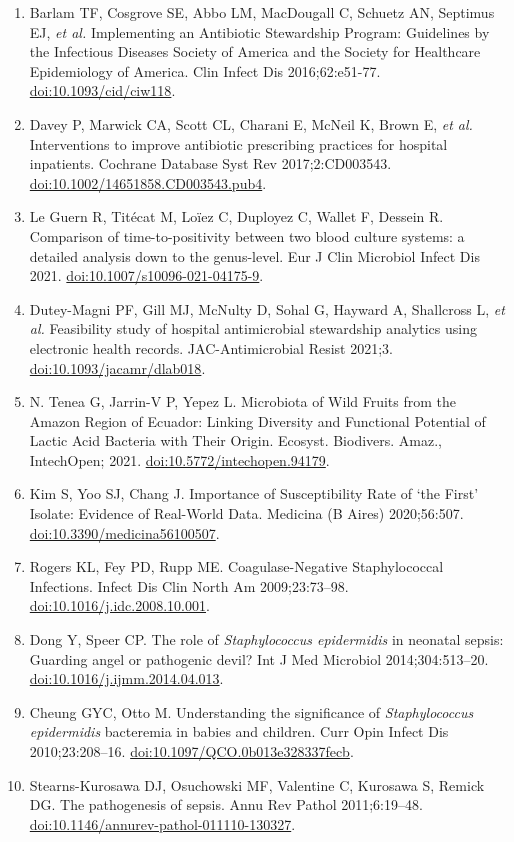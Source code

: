 \documentclass[
]{book}
\begin{document}
\begin{enumerate}
\item
  Barlam TF, Cosgrove SE, Abbo LM, MacDougall C, Schuetz AN, Septimus EJ, \emph{et al.} Implementing an Antibiotic Stewardship Program: Guidelines by the Infectious Diseases Society of America and the Society for Healthcare Epidemiology of America. Clin Infect Dis 2016;62:e51-77. \url{doi:10.1093/cid/ciw118}.
\item
  Davey P, Marwick CA, Scott CL, Charani E, McNeil K, Brown E, \emph{et al.} Interventions to improve antibiotic prescribing practices for hospital inpatients. Cochrane Database Syst Rev 2017;2:CD003543. \url{doi:10.1002/14651858.CD003543.pub4}.
\item
  Le Guern R, Titécat M, Loïez C, Duployez C, Wallet F, Dessein R. Comparison of time-to-positivity between two blood culture systems: a detailed analysis down to the genus-level. Eur J Clin Microbiol Infect Dis 2021. \url{doi:10.1007/s10096-021-04175-9}.
\item
  Dutey-Magni PF, Gill MJ, McNulty D, Sohal G, Hayward A, Shallcross L, \emph{et al.} Feasibility study of hospital antimicrobial stewardship analytics using electronic health records. JAC-Antimicrobial Resist 2021;3. \url{doi:10.1093/jacamr/dlab018}.
\item
  N. Tenea G, Jarrin-V P, Yepez L. Microbiota of Wild Fruits from the Amazon Region of Ecuador: Linking Diversity and Functional Potential of Lactic Acid Bacteria with Their Origin. Ecosyst. Biodivers. Amaz., IntechOpen; 2021. \url{doi:10.5772/intechopen.94179}.
\item
  Kim S, Yoo SJ, Chang J. Importance of Susceptibility Rate of `the First' Isolate: Evidence of Real-World Data. Medicina (B Aires) 2020;56:507. \url{doi:10.3390/medicina56100507}.
\item
  Rogers KL, Fey PD, Rupp ME. Coagulase-Negative Staphylococcal Infections. Infect Dis Clin North Am 2009;23:73--98. \url{doi:10.1016/j.idc.2008.10.001}.
\item
  Dong Y, Speer CP. The role of \emph{Staphylococcus epidermidis} in neonatal sepsis: Guarding angel or pathogenic devil? Int J Med Microbiol 2014;304:513--20. \url{doi:10.1016/j.ijmm.2014.04.013}.
\item
  Cheung GYC, Otto M. Understanding the significance of \emph{Staphylococcus epidermidis} bacteremia in babies and children. Curr Opin Infect Dis 2010;23:208--16. \url{doi:10.1097/QCO.0b013e328337fecb}.
\item
  Stearns-Kurosawa DJ, Osuchowski MF, Valentine C, Kurosawa S, Remick DG. The pathogenesis of sepsis. Annu Rev Pathol 2011;6:19--48. \url{doi:10.1146/annurev-pathol-011110-130327}.

\end{enumerate}
\end{document}
